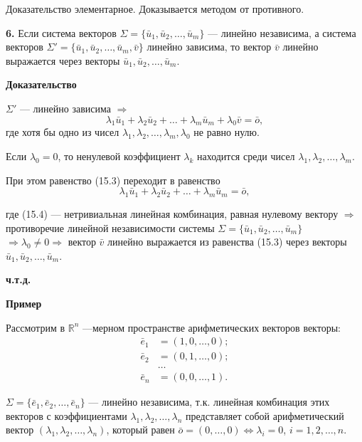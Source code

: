 \documentclass[12pt,a4paper]{article}
\newcommand{\vu}{\bar u}
\newcommand{\vv}{\bar v}
\newcommand{\ve}{\bar e}
\newcommand{\vo}{\bar o}
\begin{document}
Доказательство элементарное. Доказывается методом от противного.

\textbf{6.} Если система векторов $\Sigma = \{\vu_1, \vu_2, \ldots,
\vu_m\}$ --- линейно независима, а система векторов $\Sigma' =
\{\vu_1, \vu_2, \ldots, \vu_m, \vv\}$ линейно зависима, то вектор
$\vv$ линейно выражается через векторы $\vu_1, \vu_2, \ldots, \vu_m$.

\textbf{Доказательство}

$\Sigma'$ --- линейно зависима $\Rightarrow$
\begin{equation}
\lambda_1 \vu_1 + \lambda_2 \vu_2 + \ldots + \lambda_m \vu_m +
\lambda_0 \vv = \vo, \tag{15.3}
\end{equation}
где хотя бы одно из чисел $\lambda_1, \lambda_2, \ldots, \lambda_m,
\lambda_0$ не равно нулю.

Если $\lambda_0 = 0$, то ненулевой коэффициент $\lambda_k$ находится
среди чисел $\lambda_1, \lambda_2, \ldots, \lambda_m$.

При этом равенство (15.3) переходит в равенство
\begin{equation}
\lambda_1 \vu_1 + \lambda_2 \vu_2 + \ldots + \lambda_m \vu_m = \vo, \tag{15.4}
\end{equation}

где (15.4) --- нетривиальная линейная комбинация, равная нулевому
вектору $\Rightarrow$ противоречие линейной независимости системы
$\Sigma = \{\vu_1, \vu_2, \ldots, \vu_m\}$ $\Rightarrow \lambda_0 \ne
0 \Rightarrow$ вектор $\vv$ линейно выражается из равенства (15.3)
через векторы $\vu_1, \vu_2, \ldots, \vu_m$.

\textbf{ч.т.д.}

\textbf{Пример}

Рассмотрим в $\mathbb{R}^n$ ---мерном пространстве арифметических
векторов векторы:
\begin{align*}
\ve_1 &= (1, 0, \ldots, 0);\\
\ve_2 &= (0, 1, \ldots, 0);\\
&\ldots\\
\ve_n &= (0, 0, \ldots, 1).
\end{align*}

$\Sigma = \{\ve_1, \ve_2, \ldots, \ve_n\}$ --- линейно независима,
т.к. линейная комбинация этих векторов с коэффициентами $\lambda_1,
\lambda_2, \ldots, \lambda_n$ представляет собой арифметический
вектор $(\lambda_1, \lambda_2, \ldots, \lambda_n)$, который равен
$\vo = (0, \ldots, 0) \Leftrightarrow \lambda_i = 0$, $i = 1, 2, \ldots, n$.
\end{document}
